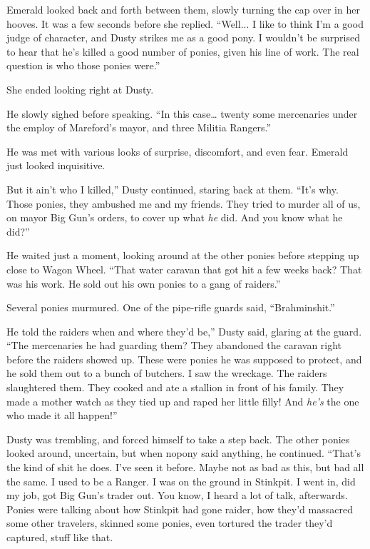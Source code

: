 Emerald looked back and forth between them, slowly turning the cap over in her hooves. It was a few seconds before she replied. “Well... I like to think I’m a good judge of character, and Dusty strikes me as a good pony. I wouldn’t be surprised to hear that he’s killed a good number of ponies, given his line of work. The real question is who those ponies were.”

She ended looking right at Dusty.

He slowly sighed before speaking. “In this case… twenty some mercenaries under the employ of Mareford’s mayor, and three Militia Rangers.”

He was met with various looks of surprise, discomfort, and even fear. Emerald just looked inquisitive.

\leavevmode{}But it ain’t who I killed,” Dusty continued, staring back at them. “It’s why. Those ponies, they ambushed me and my friends. They tried to murder all of us, on mayor Big Gun’s orders, to cover up what \textit{he} did. And you know what he did?”

He waited just a moment, looking around at the other ponies before stepping up close to Wagon Wheel. “That water caravan that got hit a few weeks back? That was his work. He sold out his own ponies to a gang of raiders.”

Several ponies murmured. One of the pipe-rifle guards said, “Brahminshit.”

\leavevmode{}He told the raiders when and where they’d be,” Dusty said, glaring at the guard. “The mercenaries he had guarding them? They abandoned the caravan right before the raiders showed up. These were ponies he was supposed to protect, and he sold them out to a bunch of butchers. I saw the wreckage. The raiders slaughtered them. They cooked and ate a stallion in front of his family. They made a mother watch as they tied up and raped her little filly! And \textit{he’s} the one who made it all happen!”

Dusty was trembling, and forced himself to take a step back. The other ponies looked around, uncertain, but when nopony said anything, he continued. “That’s the kind of shit he does. I’ve seen it before. Maybe not as bad as this, but bad all the same. I used to be a Ranger. I was on the ground in Stinkpit. I went in, did my job, got Big Gun’s trader out. You know, I heard a lot of talk, afterwards. Ponies were talking about how Stinkpit had gone raider, how they’d massacred some other travelers, skinned some ponies, even tortured the trader they’d captured, stuff like that.

